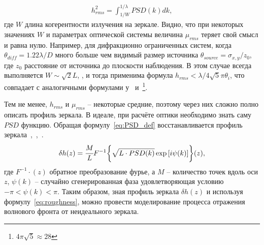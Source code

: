 \begin{align}
	h^2_{rms} =  \int^{1/\lambda}_{1/W} PSD(k) dk,
\end{align}
где $W$ длина когерентности излучения на зеркале. Видно, что при некоторых значениях $W$ и параметрах оптической системы величина $\mu_{rms}$ теряет свой смысл и равна нулю. Например, для дифракционно ограниченных систем, когда $\theta_{diff} = 1.22 \lambda / D$ много больше чем видимый размер источника $\theta_{source} = \sigma_{x, y}/z_0$, где $z_0$ расстояние от источника до плоскости наблюдения. В этом случае всегда выполняется $W \sim \sqrt{2} L$, \cite{pardini_effect_2015}, и тогда применима формула $h_{rms} < \lambda / 4 \sqrt{5} \pi \theta_i$, что совпадает с аналогичными формулами у~\cite{serkez_design_2015} и~\cite{heimann_linac_2011}\footnote{$4 \pi \sqrt{5}  \approx 28$ }.

Тем не менее, $h_{rms}$ и $\mu_{rms}$ -- некоторые средние, поэтому через них сложно полно описать профиль зеркала. В идеале, при расчёте оптики необходимо знать саму $PSD$ функцию. Обращая формулу~\ref{eq:PSD_def} восстанавливается профиль зеркала~\cite{hua_using_2013},~\cite{xu_statistical_2012},~\cite{barty_predicting_2009}.
\begin{align}
	\delta h(z) = \cfrac{M}{L} F^{-1} \bigg\{\sqrt{L \cdot PSD(k)} \exp{[i \psi(k)]} \bigg\}(z),
\end{align}
где $F^{-1}{\cdot}(z)$ обратное преобразование фурье, а $M$ -- количество точек вдоль оси $z$, $\psi(k)$ -- случайно сгенерированная фаза удовлетворяющая условию $-\pi < \psi(k) <\pi$. Таким образом, зная профиль зеркала $\delta h(z)$ и используя формулу~\ref{eq:roughness}, можно провести моделирование процесса отражения волнового фронта от неидеального зеркала.


